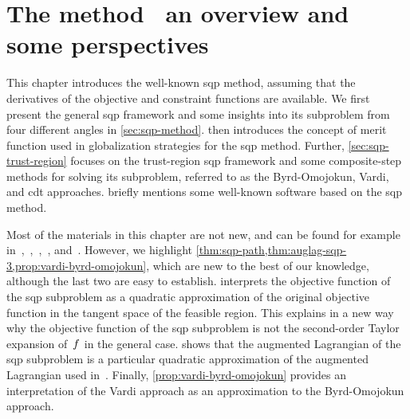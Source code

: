 %
%
%
\chapter{The  method \textemdash\ an overview and some perspectives}
\label{ch:sqp}

This chapter introduces the well-known \gls{sqp} method, assuming that the derivatives of the objective and constraint functions are available.
We first present the general \gls{sqp} framework and some insights into its subproblem from four different angles in \cref{sec:sqp-method}.
 then introduces the concept of merit function used in globalization strategies for the \gls{sqp} method.
Further, \cref{sec:sqp-trust-region} focuses on the trust-region \gls{sqp} framework and some composite-step methods for solving its subproblem, referred to as the Byrd-Omojokun, Vardi, and \gls{cdt} approaches.
 briefly mentions some well-known software based on the \gls{sqp} method.

Most of the materials in this chapter are not new, and can be found for example in~\cite{Boggs_Tolle_1995,Gould_Toint_2000},~\cite[Ch.~15]{Conn_Gould_Toint_2000},~\cite[Ch.~12]{Sun_Yuan_2006},~\cite[Ch.~18]{Nocedal_Wright_2006}, and~\cite{Schittkowski_Yuan_2011,Gill_Wong_2011}.
However, we highlight \cref{thm:sqp-path,thm:auglag-sqp-3,prop:vardi-byrd-omojokun}, which are new to the best of our knowledge, although the last two are easy to establish.
 interprets the objective function of the \gls{sqp} subproblem as a quadratic approximation of the original objective function in the tangent space of the feasible region.
This explains in a new way why the objective function of the \gls{sqp} subproblem is not the second-order Taylor expansion of~$f$ in the general case.
 shows that the augmented Lagrangian of the \gls{sqp} subproblem is a particular quadratic approximation of the augmented Lagrangian used in~\cite{Niu_Yuan_2010,Wang_Yuan_2014}.
Finally, \cref{prop:vardi-byrd-omojokun} provides an interpretation of the Vardi approach as an approximation to the Byrd-Omojokun approach.

